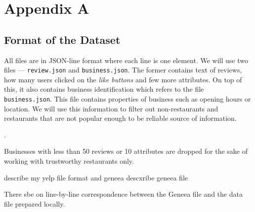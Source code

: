 \chapter*{Appendix A}
\label{app:a}


\section{Format of the Dataset}

All files are in JSON-line format where each line is one element. We will use two files --- \texttt{review.json} and \texttt{business.json}. The former contains text of reviews, how many users clicked on the \emph{like buttons} and few more attributes. On top of this, it also contains business identification which refers to the file \texttt{business.json}. This file contains properties of business such as opening hours or location. We will use this information to filter out non-restaurants and restaurants that are not popular enough to be reliable source of information.

.  



Businesses with less than 50 reviews or 10 attributes are dropped for the sake of working with trustworthy restaurants only.

describe my yelp file format and geneea
descxribe geneea file

There sbe on line-by-line correspondence between the Geneea file and the data file prepared locally.
